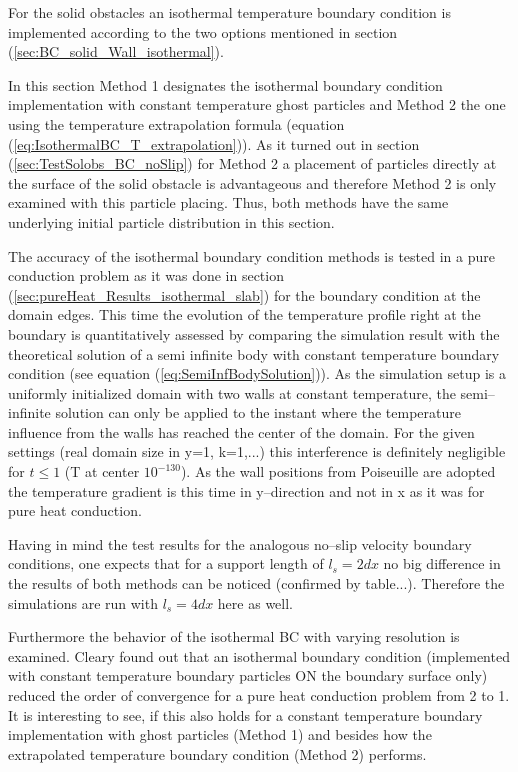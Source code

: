 \documentclass{report}
\begin{document}
For the solid obstacles an isothermal temperature boundary condition is implemented according to the two options mentioned in section (\ref{sec:BC_solid_Wall_isothermal}).

In this section Method 1 designates the isothermal boundary condition implementation with constant temperature ghost particles and Method 2 the one using the temperature extrapolation formula (equation (\ref{eq:IsothermalBC_T_extrapolation})).
As it turned out in section (\ref{sec:TestSolobs_BC_noSlip}) for Method 2 a placement of particles directly at the surface of the solid obstacle is advantageous and therefore Method 2 is only examined with this particle placing. Thus, both methods have the same underlying initial particle distribution in this section. 

The accuracy of the isothermal boundary condition methods is tested in a pure conduction problem as it was done in section (\ref{sec:pureHeat_Results_isothermal_slab}) for the boundary condition at the domain edges. This time the evolution of the temperature profile right at the boundary is quantitatively assessed by comparing the simulation result with the theoretical solution of a semi infinite body with constant temperature boundary condition (see equation (\ref{eq:SemiInfBodySolution})).
As the simulation setup is a uniformly initialized domain with two walls at constant temperature, the semi--infinite solution can only be applied to the instant where the temperature influence from the walls has reached the center of the domain. For the given settings (real domain size in y=1, k=1,...) this interference is definitely negligible for $t\leq 1$ (T at center $10^{-130}$). As the wall positions from Poiseuille are adopted the temperature gradient is this time in y--direction and not in x as it was for pure heat conduction.

Having in mind the test results for the analogous no--slip velocity boundary conditions, one expects that for a support length of $l_s=2dx$ no big difference in the results of both methods can be noticed (confirmed by table...). Therefore the simulations are run with $l_s=4dx$ here as well. 

Furthermore the behavior of the isothermal BC with varying resolution is examined. Cleary \cite{Cleary1999} found out that an isothermal boundary condition (implemented with constant temperature boundary particles ON the boundary surface only) reduced the order of convergence for a pure heat conduction problem from 2 to 1. It is interesting to see, if this also holds for a constant temperature boundary implementation with ghost particles (Method 1) and besides how the extrapolated temperature boundary condition (Method 2) performs.
\end{document}
